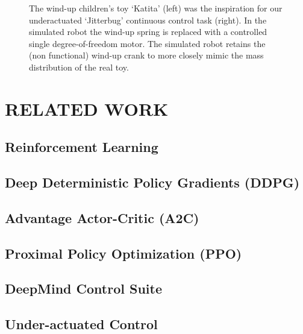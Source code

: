 \documentclass[letterpaper, 10 pt, conference]{ieeeconf}
\begin{document}
\begin{figure}[ht]
    \caption{
        The wind-up children's toy `Katita' (left) was the inspiration for our underactuated `Jitterbug' continuous control task (right).
        In the simulated robot the wind-up spring is replaced with a controlled single degree-of-freedom motor.
        The simulated robot retains the (non functional) wind-up crank to more closely mimic the mass distribution of the real toy.
    }
    \label{fig:leader}
    
\end{figure}

\lipsum[1-4]

\section{RELATED WORK}

\subsection{Reinforcement Learning}

\subsection{Deep Deterministic Policy Gradients (DDPG)}

\subsection{Advantage Actor-Critic (A2C)}

\subsection{Proximal Policy Optimization (PPO)}

\subsection{DeepMind Control Suite}

\subsection{Under-actuated Control}

\lipsum[1-2]
\end{document}
